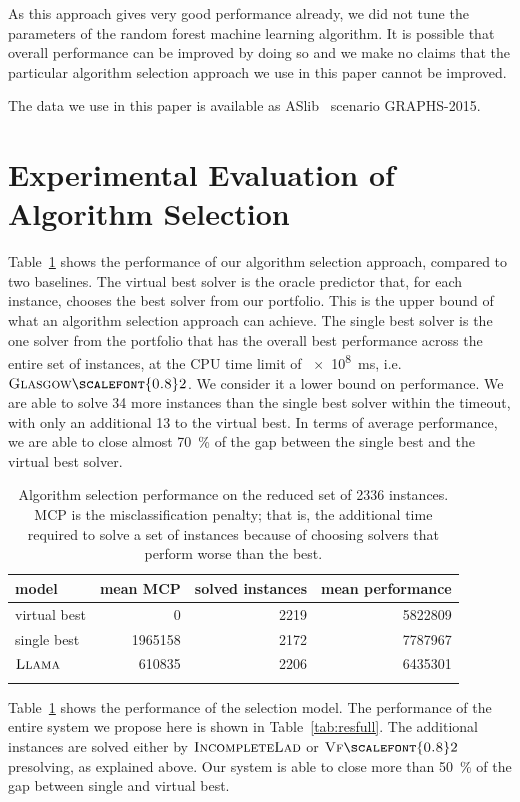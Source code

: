 \documentclass{llncs}
\newcommand{\VFtwo}{$\textsc{Vf{\scalefont{0.8}2}}$\xspace}
\newcommand{\IncompleteLAD}{$\textsc{IncompleteLad}$\xspace}
\newcommand{\GlasgowTwo}{$\textsc{Glasgow{\scalefont{0.8}2}}$\xspace}
\newcommand{\LLAMA}{$\textsc{Llama}$\xspace}
\begin{document}
As this approach gives very good performance already, we did not tune the parameters of the random
forest machine learning algorithm. It is possible that overall performance can be improved by doing
so and we make no claims that the particular algorithm selection approach we use in this paper
cannot be improved.

The data we use in this paper is available as ASlib~\cite{aslib} scenario GRAPHS-2015.

\section{Experimental Evaluation of Algorithm Selection}

Table~\ref{tab:res} shows the performance of our algorithm selection approach, compared to two
baselines. The virtual best solver is the oracle predictor that, for each instance, chooses the best
solver from our portfolio. This is the upper bound of what an algorithm selection approach can
achieve. The single best solver is the one solver from the portfolio that has the overall best
performance across the entire set of instances, at the CPU time limit of \SI{e8}{\ms},
i.e.\ \GlasgowTwo. We consider it a lower bound on performance.
We are able to solve 34 more instances than the single best solver within the timeout, with only an
additional 13 to the virtual best. In terms of average performance, we are able to close almost
\SI{70}{\percent} of the gap between the single best and the virtual best solver.

\begin{table}[ht]
    \centering\setlength{\tabcolsep}{1em}
\begin{tabular}{lrrr}
  \toprule
model & mean MCP & solved instances & mean performance\\
  \midrule
virtual best & 0 & 2219 & 5822809\\
single best & 1965158 & 2172 & 7787967\\
\LLAMA & 610835 & 2206 & 6435301\\
   \bottomrule \\
\end{tabular}
\caption{Algorithm selection performance on the reduced set of 2336
instances. MCP is the misclassification penalty; that is, the additional time
required to solve a set of instances because of choosing solvers that perform
worse than the best.}\label{tab:res} \end{table}

Table~\ref{tab:res} shows the performance of the selection model. The performance of the entire
system we propose here is shown in Table~\ref{tab:resfull}. The additional instances are solved
either by \IncompleteLAD or \VFtwo presolving, as explained above. Our system is able to close more than
\SI{50}{\percent} of the gap between single and virtual best.
\end{document}
